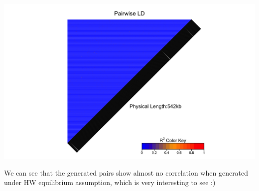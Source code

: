\documentclass[
]{article}
\begin{document}
\includegraphics[width=7in]{./res_sample_heatmap}

We can see that the generated pairs show almost no correlation when
generated under HW equilibrium assumption, which is very interesting to
see :)
\end{document}
